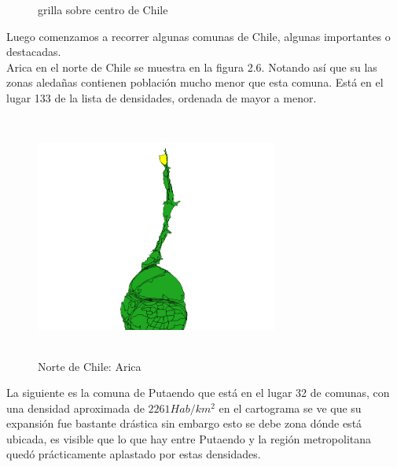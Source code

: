 \documentclass[20pt]{report}
\begin{document}
\begin{itemize}
\begin{figure}[H]
\begin{center}
\caption{grilla sobre centro de Chile}
\label{Label para referencia}
\end{center}
\end{figure}
\pagebreak
Luego comenzamos a recorrer algunas comunas  de Chile, algunas importantes o destacadas.\\
Arica en el norte de Chile se muestra en la figura 2.6. Notando as\'i que su las zonas aleda\~nas contienen poblaci\'on mucho menor que esta comuna. Est\'a en el lugar 133 de la lista de densidades, ordenada de mayor a menor.
\begin{figure}[H]
\begin{center}
\includegraphics[width=8cm, height=8cm]{arica133.png}
\vspace{-0.5cm} %
\caption{Norte de Chile: Arica}
\label{Label para referencia}
\end{center}
\end{figure}
La siguiente es la comuna de Putaendo que est\'a en el lugar 32 de comunas, con una densidad aproximada de $2261 Hab/km^2$ en el cartograma se ve que su expansi\'on fue bastante dr\'astica sin embargo esto se debe zona d\'onde est\'a ubicada, es visible que lo que hay entre Putaendo y la regi\'on metropolitana qued\'o pr\'acticamente aplastado por estas densidades.



\end{itemize}
\end{document}
